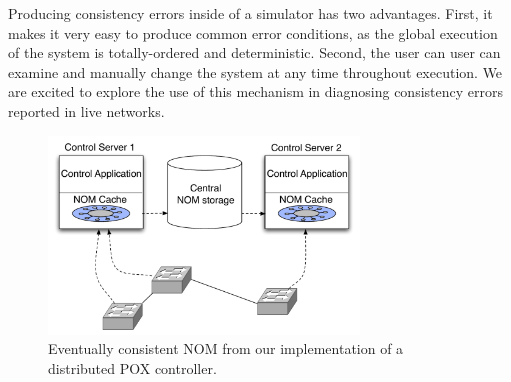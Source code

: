 Producing consistency errors inside of a simulator has two advantages. First,
it makes it very easy to produce common error conditions, as the global
execution of the system is totally-ordered and deterministic. Second, the user
can user can examine and manually change the system at any time throughout
execution. We are excited to explore the use of this mechanism in diagnosing
consistency errors reported in live networks. 

\begin{figure}[t]
    \hspace{-10pt}
    \includegraphics[width=3.25in]{../diagrams/architecture/eventually_consistent_nom.pdf}
    \caption[]{\label{fig:split_db_nom} Eventually consistent NOM from our implementation of a distributed POX controller.} 
\end{figure}



